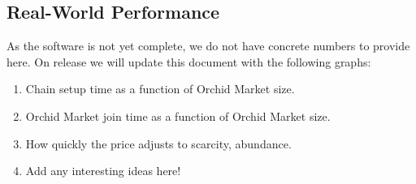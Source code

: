 \subsection*{Real-World Performance}

As the software is not yet complete, we do not have concrete numbers
to provide here. On release we will update this document with the
following graphs:

\begin{enumerate}
  \item Chain setup time as a function of Orchid Market size.
  \item Orchid Market join time as a function of Orchid Market size.
  \item How quickly the price adjusts to scarcity, abundance.
  \item Add any interesting ideas here!
\end{enumerate}
